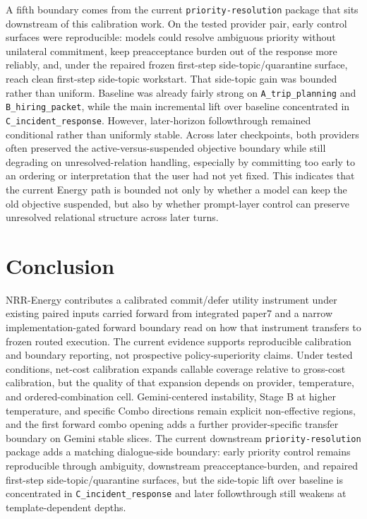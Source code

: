 \documentclass[11pt,a4paper]{article}
\begin{document}
A fifth boundary comes from the current \texttt{priority-resolution} package that sits downstream of this calibration work. On the tested provider pair, early control surfaces were reproducible: models could resolve ambiguous priority without unilateral commitment, keep preacceptance burden out of the response more reliably, and, under the repaired frozen first-step side-topic/quarantine surface, reach clean first-step side-topic workstart. That side-topic gain was bounded rather than uniform. Baseline was already fairly strong on \texttt{A\_trip\_planning} and \texttt{B\_hiring\_packet}, while the main incremental lift over baseline concentrated in \texttt{C\_incident\_response}. However, later-horizon followthrough remained conditional rather than uniformly stable. Across later checkpoints, both providers often preserved the active-versus-suspended objective boundary while still degrading on unresolved-relation handling, especially by committing too early to an ordering or interpretation that the user had not yet fixed. This indicates that the current Energy path is bounded not only by whether a model can keep the old objective suspended, but also by whether prompt-layer control can preserve unresolved relational structure across later turns.

\section{Conclusion}
\label{sec:conclusion}

NRR-Energy contributes a calibrated commit/defer utility instrument under existing paired inputs carried forward from integrated paper7 and a narrow implementation-gated forward boundary read on how that instrument transfers to frozen routed execution. The current evidence supports reproducible calibration and boundary reporting, not prospective policy-superiority claims. Under tested conditions, net-cost calibration expands callable coverage relative to gross-cost calibration, but the quality of that expansion depends on provider, temperature, and ordered-combination cell. Gemini-centered instability, Stage B at higher temperature, and specific Combo directions remain explicit non-effective regions, and the first forward combo opening adds a further provider-specific transfer boundary on Gemini stable slices. The current downstream \texttt{priority-resolution} package adds a matching dialogue-side boundary: early priority control remains reproducible through ambiguity, downstream preacceptance-burden, and repaired first-step side-topic/quarantine surfaces, but the side-topic lift over baseline is concentrated in \texttt{C\_incident\_response} and later followthrough still weakens at template-dependent depths.
\end{document}
